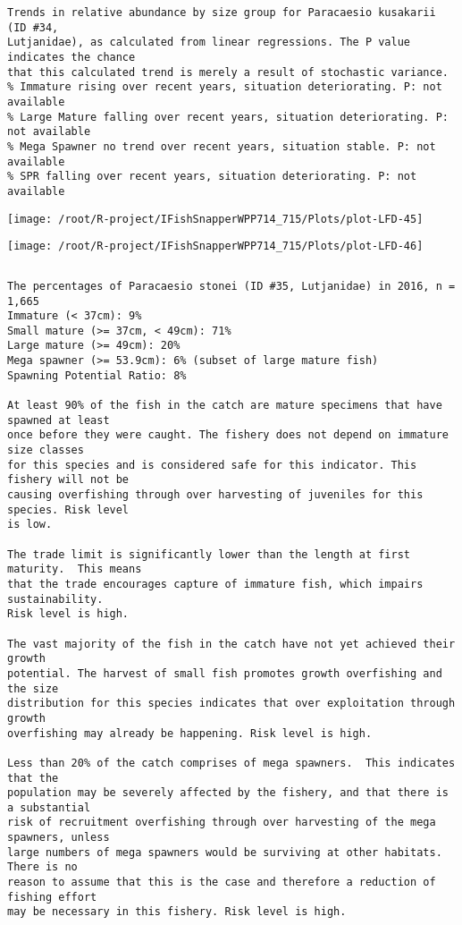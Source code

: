 \documentclass{report}\usepackage[]{graphicx}\usepackage[]{color}
\makeatletter
\def\maxwidth{ %
  \ifdim\Gin@nat@width>\linewidth
    \linewidth
  \else
    \Gin@nat@width
  \fi
}
\newenvironment{kframe}{%
 \def\at@end@of@kframe{}%
 \ifinner\ifhmode%
  \def\at@end@of@kframe{\end{minipage}}%
  \begin{minipage}{\columnwidth}%
 \fi\fi%
 \def\FrameCommand##1{\hskip\@totalleftmargin \hskip-\fboxsep
 \colorbox{shadecolor}{##1}\hskip-\fboxsep
     \hskip-\linewidth \hskip-\@totalleftmargin \hskip\columnwidth}%
 \MakeFramed {\advance\hsize-\width
   \@totalleftmargin\z@ \linewidth\hsize
   \@setminipage}}%
 {\par\unskip\endMakeFramed%
 \at@end@of@kframe}
\newenvironment{knitrout}{}{} %
\makeatother
\begin{document}
\begin{knitrout}
\begin{kframe}
\begin{verbatim}
Trends in relative abundance by size group for Paracaesio kusakarii (ID #34,
Lutjanidae), as calculated from linear regressions. The P value indicates the chance
that this calculated trend is merely a result of stochastic variance.
% Immature rising over recent years, situation deteriorating. P: not available
% Large Mature falling over recent years, situation deteriorating. P: not available
% Mega Spawner no trend over recent years, situation stable. P: not available
% SPR falling over recent years, situation deteriorating. P: not available
\end{verbatim}
\end{kframe}
\texttt{[image: /root/R-project/IFishSnapperWPP714\_715/Plots/plot-LFD-45]} 

\texttt{[image: /root/R-project/IFishSnapperWPP714\_715/Plots/plot-LFD-46]} 
\begin{kframe}\begin{verbatim}
\end{verbatim}
\end{kframe}
\clearpage
\newpage
\begin{kframe}\begin{verbatim}The percentages of Paracaesio stonei (ID #35, Lutjanidae) in 2016, n = 1,665
Immature (< 37cm): 9%
Small mature (>= 37cm, < 49cm): 71%
Large mature (>= 49cm): 20%
Mega spawner (>= 53.9cm): 6% (subset of large mature fish)
Spawning Potential Ratio: 8%
 
At least 90% of the fish in the catch are mature specimens that have spawned at least
once before they were caught. The fishery does not depend on immature size classes
for this species and is considered safe for this indicator. This fishery will not be
causing overfishing through over harvesting of juveniles for this species. Risk level
is low.

The trade limit is significantly lower than the length at first maturity.  This means
that the trade encourages capture of immature fish, which impairs sustainability.
Risk level is high.

The vast majority of the fish in the catch have not yet achieved their growth
potential. The harvest of small fish promotes growth overfishing and the size
distribution for this species indicates that over exploitation through growth
overfishing may already be happening. Risk level is high.

Less than 20% of the catch comprises of mega spawners.  This indicates that the
population may be severely affected by the fishery, and that there is a substantial
risk of recruitment overfishing through over harvesting of the mega spawners, unless
large numbers of mega spawners would be surviving at other habitats. There is no
reason to assume that this is the case and therefore a reduction of fishing effort
may be necessary in this fishery. Risk level is high.
 

\end{verbatim}
\end{kframe}
\end{knitrout}
\end{document}
